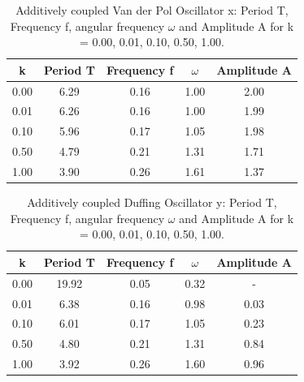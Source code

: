 \documentclass[oneside,10pt,a4paper]{report}
\begin{document}
		\begin{table}[H]
			\centering
			\caption{Additively coupled Van der Pol Oscillator x: Period T, Frequency f, angular frequency $\omega$ and Amplitude A for k = 0.00, 0.01, 0.10, 0.50, 1.00.}
			\label{tab: freq_x}
			\begin{tabular}{c c c c c}
				\toprule
				k & Period T & Frequency f & $\omega$ & Amplitude A \\
				\midrule
				0.00 & 6.29 & 0.16 & 1.00 & 2.00 \\
				0.01 & 6.26 & 0.16 & 1.00 & 1.99 \\
				0.10 & 5.96 & 0.17 & 1.05 & 1.98 \\
				0.50 & 4.79 & 0.21 & 1.31 & 1.71 \\
				1.00 & 3.90 & 0.26 & 1.61 & 1.37 \\
				\bottomrule
			\end{tabular}
		\end{table}
		\begin{table}[H]
			\centering
			\caption{Additively coupled Duffing Oscillator y: Period T, Frequency f, angular frequency $\omega$ and Amplitude A for k = 0.00, 0.01, 0.10, 0.50, 1.00.}
			\label{tab: freq_y}
			\begin{tabular}{c c c c c}
				\toprule
				k & Period T & Frequency f & $\omega$ & Amplitude A \\
				\midrule
				0.00 &19.92 & 0.05 & 0.32 & - \\
				0.01 & 6.38 & 0.16 & 0.98 & 0.03 \\
				0.10 & 6.01 & 0.17 & 1.05 & 0.23 \\
				0.50 & 4.80 & 0.21 & 1.31 & 0.84 \\
				1.00 & 3.92 & 0.26 & 1.60 & 0.96 \\
				\bottomrule
			\end{tabular}
		\end{table}
		
\end{document}
